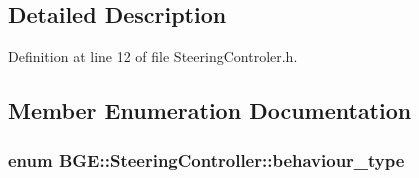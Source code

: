 \subsection{Detailed Description}


Definition at line 12 of file Steering\-Controler.\-h.



\subsection{Member Enumeration Documentation}
\hypertarget{class_b_g_e_1_1_steering_controller_abebc62a28e58ef3c7fc189941629aa53}{
\subsubsection[{behaviour\-\_\-type}]{\setlength{\rightskip}{0pt plus 5cm}enum {\bf B\-G\-E\-::\-Steering\-Controller\-::behaviour\-\_\-type}}}\label{class_b_g_e_1_1_steering_controller_abebc62a28e58ef3c7fc189941629aa53}
